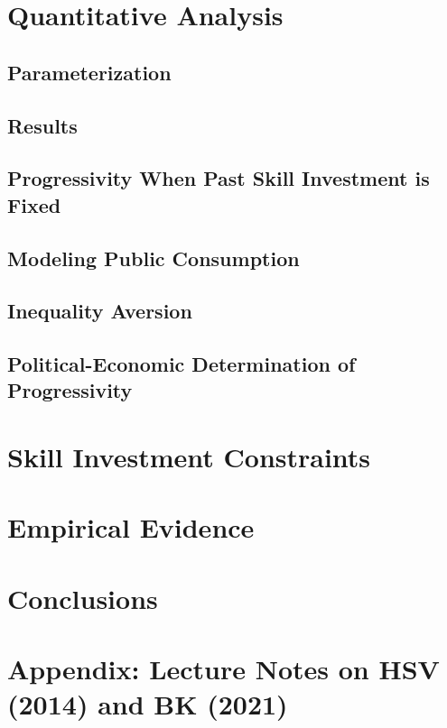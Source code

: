 \documentclass{article}
\begin{document}
\section{Quantitative Analysis}

\subsection{Parameterization}

\subsection{Results}

\subsection{Progressivity When Past Skill Investment is Fixed}

\subsection{Modeling Public Consumption}

\subsection{Inequality Aversion}

\subsection{Political-Economic Determination of Progressivity}

\section{Skill Investment Constraints}

\section{Empirical Evidence}

\section{Conclusions}

\pagebreak

\section*{Appendix: Lecture Notes on HSV (2014) and BK (2021)}
\end{document}
